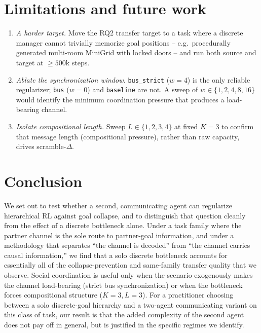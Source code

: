 \documentclass{article}
\begin{document}
\section{Limitations and future work}
\label{sec:limitations}

\begin{enumerate}[nosep,leftmargin=*]
\item \emph{A harder target.} Move the RQ2 transfer target to a task
where a discrete manager cannot trivially memorize goal positions --
e.g.\ procedurally generated multi-room MiniGrid with locked doors --
and run both source and target at $\geq 500$k steps.
\item \emph{Ablate the synchronization window.} \texttt{bus\_strict}
($w{=}4$) is the only reliable regularizer; \texttt{bus} ($w{=}0$) and
\texttt{baseline} are not. A sweep of $w \in \{1, 2, 4, 8, 16\}$ would
identify the minimum coordination pressure that produces a
load-bearing channel.
\item \emph{Isolate compositional length.} Sweep $L \in \{1, 2, 3, 4\}$
at fixed $K = 3$ to confirm that message length (compositional
pressure), rather than raw capacity, drives scramble-$\Delta$.
\end{enumerate}

\section{Conclusion}

We set out to test whether a second, communicating agent can regularize
hierarchical RL against goal collapse, and to distinguish that question
cleanly from the effect of a discrete bottleneck alone. Under a task
family where the partner channel is the sole route to partner-goal
information, and under a methodology that separates ``the channel is
decoded'' from ``the channel carries causal information,'' we find that
a solo discrete bottleneck accounts for essentially all of the
collapse-prevention and same-family transfer quality that we observe.
Social coordination is useful only when the scenario exogenously makes
the channel load-bearing (strict bus synchronization) or when the
bottleneck forces compositional structure ($K{=}3, L{=}3$). For a
practitioner choosing between a solo discrete-goal hierarchy and a
two-agent communicating variant on this class of task, our result is
that the added complexity of the second agent does not pay off in
general, but is justified in the specific regimes we identify.

{\small


}
\end{document}
